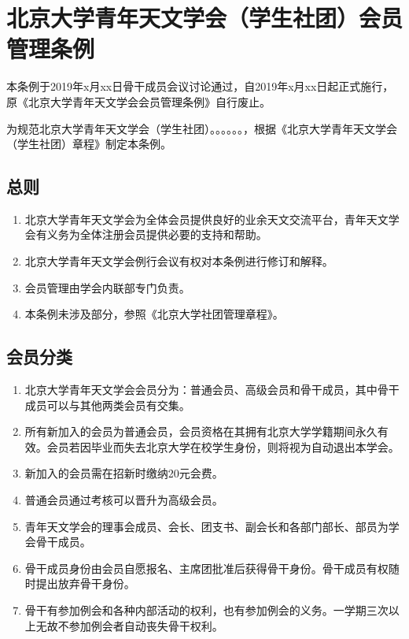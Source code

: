 \chapter{北京大学青年天文学会（学生社团）会员管理条例}

本条例于2019年x月xx日骨干成员会议讨论通过，自2019年x月xx日起正式施行，原《北京大学青年天文学会会员管理条例》自行废止。

为规范北京大学青年天文学会（学生社团）。。。。。。，根据《北京大学青年天文学会（学生社团）章程》制定本条例。

\section{总则}

\begin{enumerate}
    \item 北京大学青年天文学会为全体会员提供良好的业余天文交流平台，青年天文学会有义务为全体注册会员提供必要的支持和帮助。
    
    \item 北京大学青年天文学会例行会议有权对本条例进行修订和解释。
    
    \item 会员管理由学会内联部专门负责。
    
    \item 本条例未涉及部分，参照《北京大学社团管理章程》。
\end{enumerate}

\section{会员分类}

\begin{enumerate}[resume]
    \item 北京大学青年天文学会会员分为：普通会员、高级会员和骨干成员，其中骨干成员可以与其他两类会员有交集。
    
    \item 所有新加入的会员为普通会员，会员资格在其拥有北京大学学籍期间永久有效。会员若因毕业而失去北京大学在校学生身份，则将视为自动退出本学会。
    
    \item 新加入的会员需在招新时缴纳20元会费。
    
    \item 普通会员通过考核可以晋升为高级会员。
    
    \item 青年天文学会的理事会成员、会长、团支书、副会长和各部门部长、部员为学会骨干成员。
    
    \item 骨干成员身份由会员自愿报名、主席团批准后获得骨干身份。骨干成员有权随时提出放弃骨干身份。
    
    \item 骨干有参加例会和各种内部活动的权利，也有参加例会的义务。一学期三次以上无故不参加例会者自动丧失骨干权利。
\end{enumerate}

